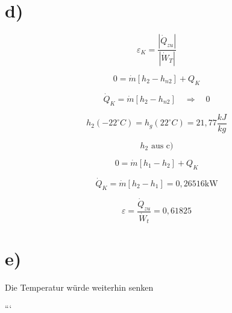 \section*{d)}

\[
\varepsilon_{K} = \frac{|\dot{Q}_{zu}|}{|\dot{W}_{T}|}
\]

\[
0 = \dot{m} [h_{2} - h_{n2}] + Q_{K}
\]

\[
\dot{Q}_{K} = \dot{m} [h_{2} - h_{n2}] \quad \Rightarrow \quad 0
\]

\[
h_{2} (-22^\circ C) = h_{g} (22^\circ C) = 21,77 \frac{kJ}{kg}
\]

\[
h_{2} \text{ aus c)}
\]

\[
0 = \dot{m} [h_{1} - h_{2}] + Q_{K}
\]

\[
\dot{Q}_{K} = \dot{m} [h_{2} - h_{1}] = 0,26516 \text{kW}
\]

\[
\varepsilon = \frac{\dot{Q}_{zu}}{\dot{W}_{t}} = 0,61825
\]

\section*{e)}

Die Temperatur würde weiterhin senken

```